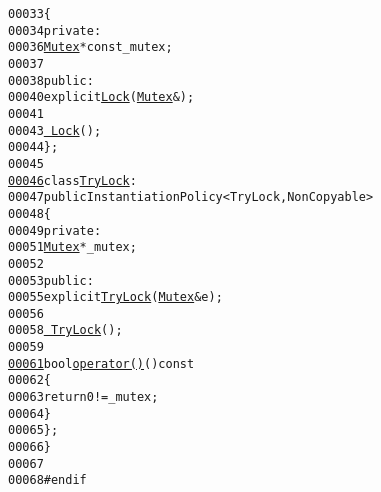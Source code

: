\begin{footnotesize}
\begin{alltt}
00033     \{
00034         \textcolor{keyword}{private}:
00036             \hyperlink{classeos_1_1Mutex}{Mutex} * \textcolor{keyword}{const} \_mutex;
00037 
00038         \textcolor{keyword}{public}:
00040             \textcolor{keyword}{explicit} \hyperlink{classeos_1_1Lock_a9d5a54ae7320ee6adc68711d7189fcd1}{Lock}(\hyperlink{classeos_1_1Mutex}{Mutex} &);
00041 
00043             \hyperlink{classeos_1_1Lock_aa04c35d89ef9fcf1a87d40e34713ffc7}{~Lock}();
00044     \};
00045 
\hypertarget{lock_8hh_source_l00046}{}\hyperlink{classeos_1_1TryLock}{00046}     \textcolor{keyword}{class }\hyperlink{classeos_1_1TryLock}{TryLock} :
00047         \textcolor{keyword}{public} InstantiationPolicy<TryLock, NonCopyable>
00048     \{
00049         \textcolor{keyword}{private}:
00051             \hyperlink{classeos_1_1Mutex}{Mutex} * \_mutex;
00052 
00053         \textcolor{keyword}{public}:
00055             \textcolor{keyword}{explicit} \hyperlink{classeos_1_1TryLock_a5f8bf57965139e53a558712b80a8a842}{TryLock}(\hyperlink{classeos_1_1Mutex}{Mutex} & e);
00056 
00058             \hyperlink{classeos_1_1TryLock_a152750e617dbda392da45a234dd3c41f}{~TryLock}();
00059 
\hypertarget{lock_8hh_source_l00061}{}\hyperlink{classeos_1_1TryLock_ac0b6b930a21cf09894d97883d352dee7}{00061}             \textcolor{keywordtype}{bool} \hyperlink{classeos_1_1TryLock_ac0b6b930a21cf09894d97883d352dee7}{operator() }()\textcolor{keyword}{ const}
00062 \textcolor{keyword}{            }\{
00063                 \textcolor{keywordflow}{return} 0 != \_mutex;
00064             \}
00065     \};
00066 \}
00067 
00068 \textcolor{preprocessor}{#endif}
\end{alltt}\end{footnotesize}

